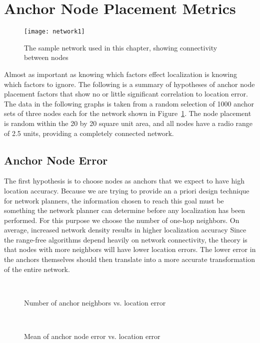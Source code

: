 \section{Anchor Node Placement Metrics}
\begin{figure}
	\centering
		\texttt{[image: network1]}
	\caption[The sample network used in this chapter]{The sample network used in this chapter, showing connectivity between nodes}
	\label{fig:HypothesesNetwork}
\end{figure}

Almost as important as knowing which factors effect localization is knowing which factors to ignore. The following is a summary of hypotheses of anchor node placement factors that show no or little significant correlation to location error.  The data in the following graphs is taken from a random selection of 1000 anchor sets of three nodes each for the network shown in Figure~\ref{fig:HypothesesNetwork}.  The node placement is random within the 20 by 20 square unit area, and all nodes have a radio range of 2.5 units, providing a completely connected network.

\subsection{Anchor Node Error}
The first hypothesis is to choose nodes as anchors that we expect to have high location accuracy. Because we are trying to provide an a priori design technique for network planners, the information chosen to reach this goal must be something the network planner can determine before any localization has been performed.  For this purpose we choose the number of one-hop neighbors.  On average, increased network density results in higher  localization accuracy\cite{MDS-MAP,CCA-MAP07}  Since the range-free algorithms depend heavily on network connectivity, the theory is that nodes with more neighbors will have lower location errors.  The lower error in the anchors themselves should then translate into a more accurate transformation of the entire network.

\begin{figure}
  \centering
\\
	\caption{Number of anchor neighbors vs. location error}
	\label{fig:NumberOfAnchorNeighbors}
\end{figure}
\begin{figure}
  \centering
\\
	\caption{Mean of anchor node error vs. location error}
	\label{fig:MeanAnchorError}
\end{figure}

